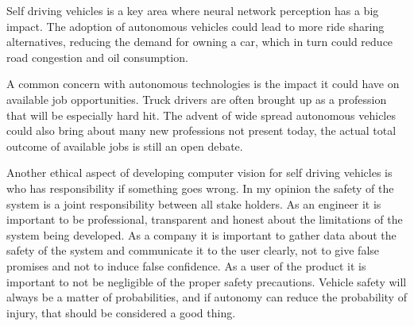 Self driving vehicles is a key area where neural network perception has a big impact. The adoption of autonomous vehicles could lead to more ride sharing alternatives, reducing the demand for owning a car, which in turn could reduce road congestion and oil consumption. \cite{transportation}

A common concern with autonomous technologies is the impact it could have on available job opportunities. Truck drivers are often brought up as a profession that will be especially hard hit. The advent of wide spread autonomous vehicles could also bring about many new professions not present today, the actual total outcome of available jobs is still an open debate.\cite{sociology}

Another ethical aspect of developing computer vision for self driving vehicles is who has responsibility if something goes wrong. In my opinion the safety of the system is a joint responsibility between all stake holders. As an engineer it is important to be professional, transparent and honest about the limitations of the system being developed. As a company it is important to gather data about the safety of the system and communicate it to the user clearly, not to give false promises and not to induce false confidence. As a user of the product it is important to not be negligible of the proper safety precautions. Vehicle safety will always be a matter of probabilities, and if autonomy can reduce the probability of injury, that should be considered a good thing.